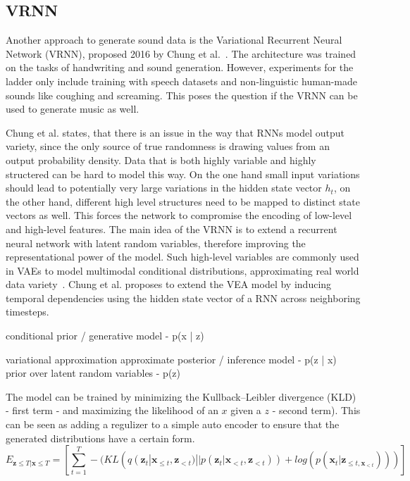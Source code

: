 \documentclass[12pt]{article}
\begin{document}
\subsection{VRNN}

\cite{VRNNgit} %


Another approach to generate sound data is the Variational Recurrent Neural Network (VRNN), proposed 2016 by Chung et al.~\cite{chung2015recurrent}.
The architecture was trained on the tasks of handwriting and sound generation.
However, experiments for the ladder only include training with speech datasets and non-linguistic human-made sounds like coughing and screaming.
This poses the question if the VRNN can be used to generate music as well.

Chung et al. states, that there is an issue in the way that RNNs model output variety, since the only source of true randomness is drawing values from an output probability density.
Data that is both highly variable and highly structered can be hard to model this way.
On the one hand small input variations should lead to potentially very large variations in the hidden state vector $h_t$, on the other hand, different high level structures need to be mapped to distinct state vectors as well.
This forces the network to compromise the encoding of low-level and high-level features.
The main idea of the VRNN is to extend a recurrent neural network with latent random variables, therefore improving the representational power of the model.
Such high-level variables are commonly used in VAEs to model multimodal conditional distributions, approximating real world data variety~\cite{kingma2013auto}.
Chung et al. proposes to extend the VEA model by inducing temporal dependencies using the hidden state vector of a RNN across neighboring timesteps.








conditional prior / generative model - p(x | z)

variational approximation 
approximate posterior / inference model - p(z | x)
prior over latent random variables - p(z)



The model can be trained by minimizing the Kullback–Leibler divergence (KLD) - first term - and maximizing the likelihood of an $x$ given a $z$ - second term).
This can be seen as adding a regulizer to a simple auto encoder to ensure that the generated distributions have a certain form.
$$
E_{\mathbf{z} \le T | \mathbf{x} \le T} = \left[ \sum_{t=1}^T -(KL(q(\mathbf{z}_t | \mathbf{x}_{\le t}, \mathbf{z}_{<t}) || p(\mathbf{z}_t | \mathbf{x}_{<t}, \mathbf{z}_{<t})) + log(p(\mathbf{x}_t | \mathbf{z}_{\le t, \mathbf{x}_{<t}}))) \right]
$$
\end{document}
